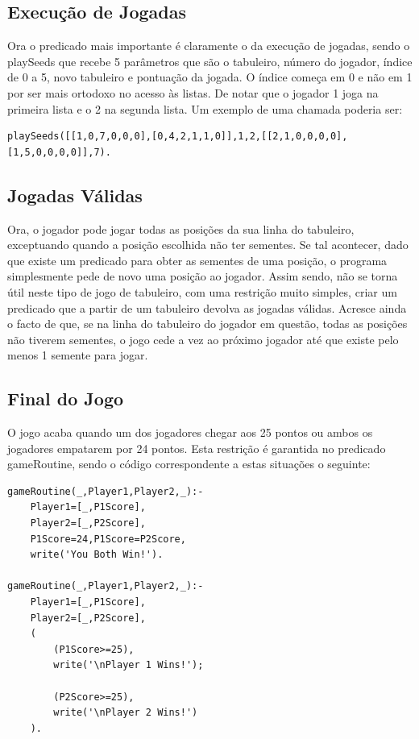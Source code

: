 \documentclass[15pt,a4paper]{article}
\begin{document}
\subsection{Execução de Jogadas}
Ora o predicado mais importante é claramente o da execução de jogadas, sendo o playSeeds que recebe 5 parâmetros que são o tabuleiro, número do jogador, índice de 0 a 5, novo tabuleiro e pontuação da jogada. O índice começa em 0 e não em 1 por ser mais ortodoxo no acesso às listas. De notar que o jogador 1 joga na primeira lista e o 2 na segunda lista. Um exemplo de uma chamada poderia ser:
\begin{verbatim}
playSeeds([[1,0,7,0,0,0],[0,4,2,1,1,0]],1,2,[[2,1,0,0,0,0],[1,5,0,0,0,0]],7).
\end{verbatim}

\subsection{Jogadas Válidas}
Ora, o jogador pode jogar todas as posições da sua linha do tabuleiro, exceptuando quando a posição escolhida não ter sementes. Se tal acontecer, dado que existe um predicado para obter as sementes de uma posição, o programa simplesmente pede de novo uma posição ao jogador. Assim sendo, não se torna útil neste tipo de jogo de tabuleiro, com uma restrição muito simples, criar um predicado que a partir de um tabuleiro devolva as jogadas válidas. Acresce ainda o facto de que, se na linha do tabuleiro do jogador em questão, todas as posições não tiverem sementes, o jogo cede a vez ao próximo jogador até que existe pelo menos 1 semente para jogar. 


\subsection{Final do Jogo}
O jogo acaba quando um dos jogadores chegar aos 25 pontos ou ambos os jogadores empatarem por 24 pontos. Esta restrição é garantida no predicado gameRoutine, sendo o código correspondente a estas situações o seguinte:
\begin{verbatim}
gameRoutine(_,Player1,Player2,_):-
	Player1=[_,P1Score],
	Player2=[_,P2Score],
	P1Score=24,P1Score=P2Score,
	write('You Both Win!').

gameRoutine(_,Player1,Player2,_):-
	Player1=[_,P1Score],
	Player2=[_,P2Score],
	(
		(P1Score>=25),
		write('\nPlayer 1 Wins!');

		(P2Score>=25),
		write('\nPlayer 2 Wins!')
	).
\end{verbatim}
\end{document}
